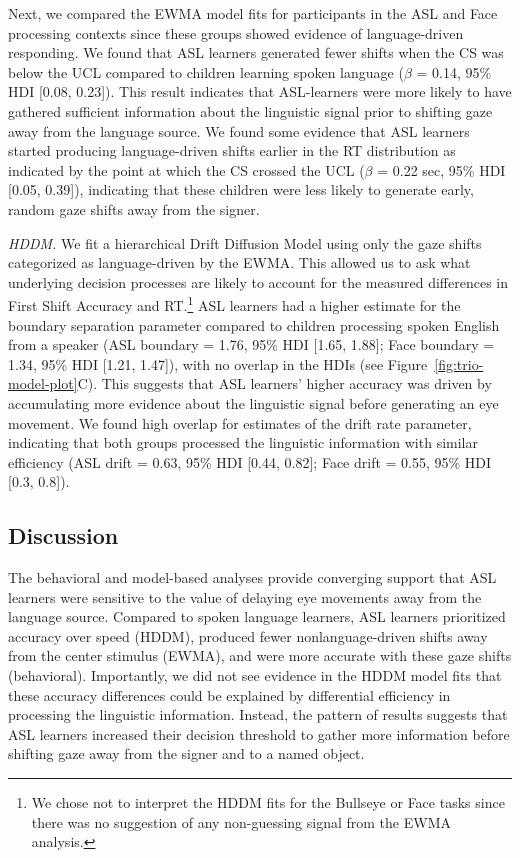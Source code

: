 \documentclass[oneside]{report}
\begin{document}
Next, we compared the EWMA model fits for participants in the ASL and
Face processing contexts since these groups showed evidence of
language-driven responding. We found that ASL learners generated fewer
shifts when the CS was below the UCL compared to children learning
spoken language (\(\beta\) = 0.14, 95\% HDI {[}0.08, 0.23{]}). This
result indicates that ASL-learners were more likely to have gathered
sufficient information about the linguistic signal prior to shifting
gaze away from the language source. We found some evidence that ASL
learners started producing language-driven shifts earlier in the RT
distribution as indicated by the point at which the CS crossed the UCL
(\(\beta\) = 0.22 sec, 95\% HDI {[}0.05, 0.39{]}), indicating that these
children were less likely to generate early, random gaze shifts away
from the signer.

\emph{HDDM.} We fit a hierarchical Drift Diffusion Model using only the
gaze shifts categorized as language-driven by the EWMA. This allowed us
to ask what underlying decision processes are likely to account for the
measured differences in First Shift Accuracy and RT.\footnote{We chose
  not to interpret the HDDM fits for the Bullseye or Face tasks since
  there was no suggestion of any non-guessing signal from the EWMA
  analysis.} ASL learners had a higher estimate for the boundary
separation parameter compared to children processing spoken English from
a speaker (ASL boundary = 1.76, 95\% HDI {[}1.65, 1.88{]}; Face boundary
= 1.34, 95\% HDI {[}1.21, 1.47{]}), with no overlap in the HDIs (see
Figure~\ref{fig:trio-model-plot}C). This suggests that ASL learners'
higher accuracy was driven by accumulating more evidence about the
linguistic signal before generating an eye movement. We found high
overlap for estimates of the drift rate parameter, indicating that both
groups processed the linguistic information with similar efficiency (ASL
drift = 0.63, 95\% HDI {[}0.44, 0.82{]}; Face drift = 0.55, 95\% HDI
{[}0.3, 0.8{]}).

\subsection{Discussion}\label{discussion-1}

The behavioral and model-based analyses provide converging support that
ASL learners were sensitive to the value of delaying eye movements away
from the language source. Compared to spoken language learners, ASL
learners prioritized accuracy over speed (HDDM), produced fewer
nonlanguage-driven shifts away from the center stimulus (EWMA), and were
more accurate with these gaze shifts (behavioral). Importantly, we did
not see evidence in the HDDM model fits that these accuracy differences
could be explained by differential efficiency in processing the
linguistic information. Instead, the pattern of results suggests that
ASL learners increased their decision threshold to gather more
information before shifting gaze away from the signer and to a named
object.
\end{document}
